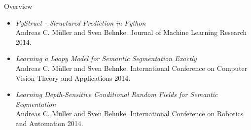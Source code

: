 \documentclass[final,ignorenonframetext,compress]{beamer}
\begin{document}
\begin{frame}{Overview}
    \tiny
\begin{itemize}
    \item
        \emph{PyStruct - Structured Prediction in Python}\\
        Andreas C. M\"uller and Sven Behnke. Journal of Machine Learning
        Research 2014.
    \item
        \emph{Learning a Loopy Model for Semantic Segmentation Exactly}\\
        Andreas C. M\"uller and Sven Behnke. International
        Conference on Computer Vision Theory and Applications 2014.
    \item
        \emph{Learning Depth-Sensitive Conditional Random Fields for Semantic Segmentation}\\
        Andreas C. M\"uller and Sven Behnke. International
        Conference on Robotics and Automation 2014.

\end{itemize}
\end{frame}

\end{document}
